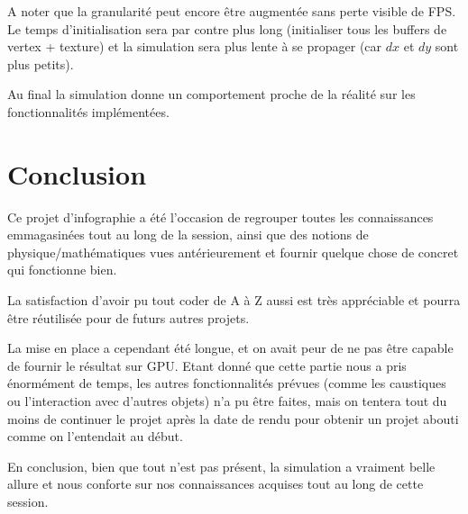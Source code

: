 \documentclass[a4paper,11pt,leqno]{article}
\begin{document}
A noter que la granularité peut encore être augmentée sans perte visible de FPS. Le temps d'initialisation sera par contre plus long (initialiser tous les buffers de vertex + texture) et la simulation sera plus lente à se propager (car $dx$ et $dy$ sont plus petits).

Au final la simulation donne un comportement proche de la réalité sur les fonctionnalités implémentées.

\section{Conclusion}

Ce projet d'infographie a été l'occasion de regrouper toutes les connaissances emmagasinées tout au long de la session, ainsi que des notions de physique/mathématiques vues antérieurement et fournir quelque chose de concret qui fonctionne bien. 

La satisfaction d'avoir pu tout coder de A à Z aussi est très appréciable et pourra être réutilisée pour de futurs autres projets.

La mise en place a cependant été longue, et on avait peur de ne pas être capable de fournir le résultat sur GPU. Etant donné que cette partie nous a pris énormément de temps, les autres fonctionnalités prévues (comme les caustiques ou l'interaction avec d'autres objets) n'a pu être faites, mais on tentera tout du moins de continuer le projet après la date de rendu pour obtenir un projet abouti comme on l'entendait au début.

En conclusion, bien que tout n'est pas présent, la simulation a vraiment belle allure et nous conforte sur nos connaissances acquises tout au long de cette session.
\end{document}
